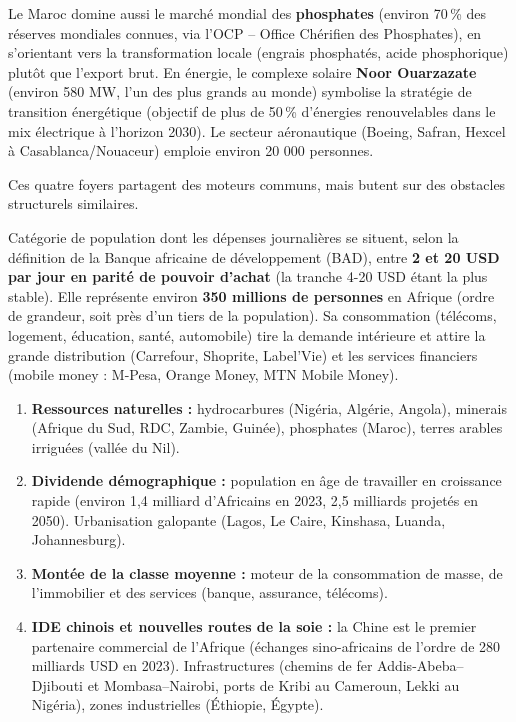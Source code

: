 \documentclass[11pt]{article}
\newcommand{\cle}[1]{{\popxbold\color{popdark}#1}}
\newcounter{popsec}
\newcounter{popsub}
\newcommand{\courssub}[1]{%
  \stepcounter{popsub}%
  \par\vspace{9pt}\noindent{\popxbold\fontsize{11.5}{13}\selectfont\color{popink}{\color{poporange}\thepopsec.\thepopsub}\hspace{6pt}#1}\par\nopagebreak\vspace{4pt}
}
\begin{document}
Le Maroc domine aussi le marché mondial des \textbf{phosphates} (environ 70\,\% des réserves mondiales connues, via l'\cle{OCP} -- Office Chérifien des Phosphates), en s'orientant vers la transformation locale (engrais phosphatés, acide phosphorique) plutôt que l'export brut. En énergie, le complexe solaire \textbf{Noor Ouarzazate} (environ 580 MW, l'un des plus grands au monde) symbolise la stratégie de transition énergétique (objectif de plus de 50\,\% d'énergies renouvelables dans le mix électrique à l'horizon 2030). Le secteur aéronautique (Boeing, Safran, Hexcel à Casablanca/Nouaceur) emploie environ 20 000 personnes.

\courssub{Facteurs et limites de l'émergence africaine}

Ces quatre foyers partagent des moteurs communs, mais butent sur des obstacles structurels similaires.

\begin{definition}
Catégorie de population dont les dépenses journalières se situent, selon la définition de la Banque africaine de développement (BAD), entre \textbf{2 et 20 USD par jour en parité de pouvoir d'achat} (la tranche 4-20 USD étant la plus stable). Elle représente environ \textbf{350 millions de personnes} en Afrique (ordre de grandeur, soit près d'un tiers de la population). Sa consommation (télécoms, logement, éducation, santé, automobile) tire la demande intérieure et attire la grande distribution (Carrefour, Shoprite, Label'Vie) et les services financiers (mobile money : M-Pesa, Orange Money, MTN Mobile Money).
\end{definition}

\begin{aretenir}
\begin{enumerate}
    \item \textbf{Ressources naturelles :} hydrocarbures (Nigéria, Algérie, Angola), minerais (Afrique du Sud, RDC, Zambie, Guinée), phosphates (Maroc), terres arables irriguées (vallée du Nil).
    \item \textbf{Dividende démographique :} population en âge de travailler en croissance rapide (environ 1,4 milliard d'Africains en 2023, 2,5 milliards projetés en 2050). Urbanisation galopante (Lagos, Le Caire, Kinshasa, Luanda, Johannesburg).
    \item \textbf{Montée de la classe moyenne :} moteur de la consommation de masse, de l'immobilier et des services (banque, assurance, télécoms).
    \item \textbf{IDE chinois et nouvelles routes de la soie :} la Chine est le premier partenaire commercial de l'Afrique (échanges sino-africains de l'ordre de 280 milliards USD en 2023). Infrastructures (chemins de fer Addis-Abeba--Djibouti et Mombasa--Nairobi, ports de Kribi au Cameroun, Lekki au Nigéria), zones industrielles (Éthiopie, Égypte).
\end{enumerate}
\end{aretenir}
\end{document}
